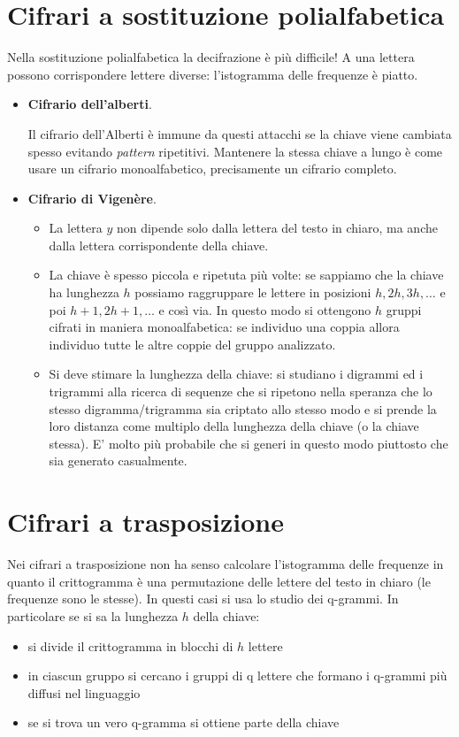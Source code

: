\section{Cifrari a sostituzione polialfabetica} 
Nella sostituzione polialfabetica la decifrazione è più difficile! A una lettera possono corrispondere lettere diverse: l'istogramma delle frequenze è piatto.
\begin{itemize}
	\item \textbf{Cifrario dell'alberti}.
	
	Il cifrario dell'Alberti è immune da questi attacchi se la chiave viene cambiata spesso evitando \textit{pattern} ripetitivi. Mantenere la stessa chiave a lungo è come usare un cifrario monoalfabetico, precisamente un cifrario completo.
	
	\item \textbf{Cifrario di Vigenère}.
	\begin{itemize}
		\item La lettera $y$ non dipende solo dalla lettera del testo in chiaro, ma anche dalla lettera corrispondente della chiave.
		\item La chiave è spesso piccola e ripetuta più volte: se sappiamo che la chiave ha lunghezza $h$ possiamo raggruppare le lettere in posizioni $h,2h,3h,\dots$ e poi $h+1,2h+1,\dots$ e così via. In questo modo si ottengono $h$ gruppi cifrati in maniera monoalfabetica: se individuo una coppia allora individuo tutte le altre coppie del gruppo analizzato.
		\item Si deve stimare la lunghezza della chiave: si studiano i digrammi ed i trigrammi alla ricerca di sequenze che si ripetono nella speranza che lo stesso digramma/trigramma sia criptato allo stesso modo e si prende la loro distanza come multiplo della lunghezza della chiave (o la chiave stessa). E' molto più probabile che si generi in questo modo piuttosto che sia generato casualmente.
	\end{itemize}
\end{itemize}
\section{Cifrari a trasposizione}
Nei cifrari a trasposizione non ha senso calcolare l'istogramma delle frequenze in quanto il crittogramma è una permutazione delle lettere del testo in chiaro (le frequenze sono le stesse). In questi casi si usa lo studio dei q-grammi. In particolare se si sa la lunghezza $h$ della chiave:
\begin{itemize}
	\item si divide il crittogramma in blocchi di $h$ lettere
	\item in ciascun gruppo si cercano i gruppi di q lettere che formano i q-grammi più diffusi nel linguaggio
	\item se si trova un vero q-gramma si ottiene parte della chiave
\end{itemize}

